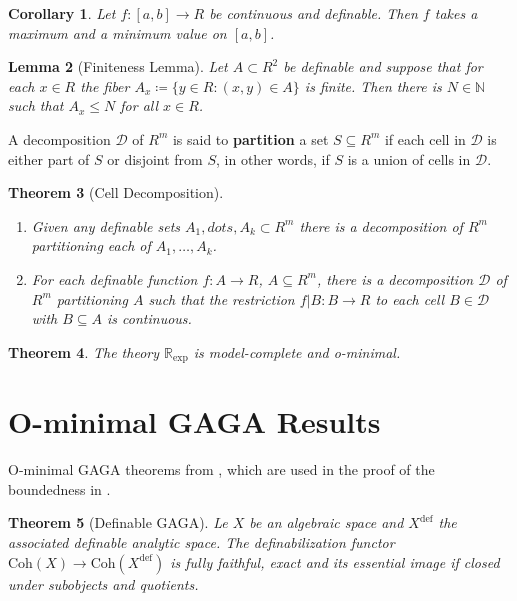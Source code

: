 \documentclass{amsart}
\newtheorem{theorem}{Theorem}[section]
\newtheorem{lemma}[theorem]{Lemma}
\newtheorem{corollary}[theorem]{Corollary}
\theoremstyle{definition}
\numberwithin{equation}{section}
\newcommand{\definable}{\mathrm{def}}
\begin{document}
\begin{corollary}
    Let $f: [a,b]\to R$ be continuous and definable.
    Then $f$ takes a maximum and a minimum value on $[a,b]$.
\end{corollary}

\begin{lemma}[Finiteness Lemma]
    Let $A \subset R^2$ be definable and suppose that for each $x\in R$
    the fiber $A_x \coloneq \{y\in R\colon (x,y)\in A\}$ is finite.
    Then there is $N \in \mathbb{N}$ such that $A_x \le N$ for all $x\in R$.
\end{lemma}

A decomposition $\mathcal{D}$ of $R^m$ is said to \textbf{partition}
a set $S \subseteq R^m$ if each cell in $\mathcal{D}$ is
either part of $S$ or disjoint from $S$,
in other words, if $S$ is a union of cells in $\mathcal{D}$.
\begin{theorem}[Cell Decomposition]
    \hfill
    \begin{enumerate}[label = {$\mathrm{(\Roman*_{m})}$}]
        \item Given any definable sets $A_1,dots,A_k \subset R^m$ there is a decomposition of $R^m$ partitioning each of $A_1,\dots,A_k$.
        \item For each definable function $f: A \to R$, $A \subseteq R^m$,
        there is a decomposition $\mathcal{D}$ of $R^m$ partitioning $A$ such that 
        the restriction $f|B: B \to R$ to each cell $B \in \mathcal{D}$ with $B \subseteq A$ is continuous.
    \end{enumerate}
\end{theorem}

\begin{theorem}
    The theory $\mathbb{R}_{\exp}$ is model-complete and o-minimal.
\end{theorem}

\section{O-minimal GAGA Results}
O-minimal GAGA theorems from \cite{zbMATH07662555},
which are used in the proof of the boundedness in \cite{arXiv:2507.00973,arXiv:2508.19215}.

\begin{theorem}[Definable GAGA]
    Le $X$ be an algebraic space and $X^{\definable}$ the associated definable analytic space.
    The definabilization functor $\mathrm{Coh}(X) \to \mathrm{Coh}(X^{\definable})$ is fully faithful, exact and 
    its essential image if closed under subobjects and quotients.
\end{theorem}
\end{document}
